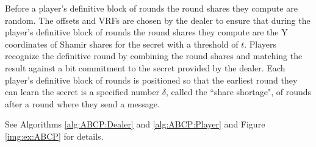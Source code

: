 \documentclass[12pt]{dalcsthesis}
\begin{document}
Before a player's definitive block of rounds the round shares they compute are random. The offsets and VRFs are chosen by the dealer to ensure that during the player's definitive block of rounds the round shares they compute are the Y coordinates of Shamir shares for the secret with a threshold of $t$. Players recognize the definitive round by combining the round shares and matching the result against a bit commitment to the secret provided by the dealer. Each player's definitive block of rounds is positioned so that the earliest round they can learn the secret is a specified number $\delta$, called the ``share shortage", of rounds after a round where they send a message.

See Algorithms \ref{alg:ABCP:Dealer} and \ref{alg:ABCP:Player} and Figure \ref{img:ex:ABCP} for details.
\end{document}
